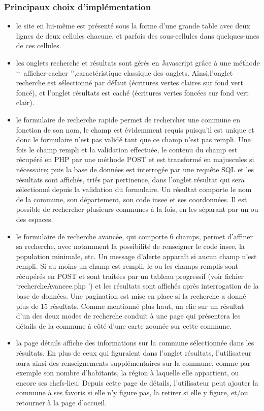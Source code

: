 \documentclass{report}
\begin{document}
\subsubsection*{Principaux choix d'implémentation}
\begin{itemize}
\item le site en lui-même est présenté sous la forme d'une grande table avec deux lignes de deux cellules chacune, et parfois des sous-cellules dans quelques-unes de ces cellules.
\item les onglets recherche et résultats sont gérés en Javascript grâce à une méthode \lq\lq\ afficher-cacher \rq\rq,caractéristique classique des onglets. Ainsi,l'onglet recherche est sélectionné par défaut (écritures vertes claires sur fond vert foncé), et l'onglet résultats est caché (écritures vertes foncées sur fond vert clair).
\item le formulaire de recherche rapide permet de rechercher une commune en fonction de son nom, le champ est évidemment requis puisqu'il est unique et donc le formulaire n'est pas validé tant que ce champ n'est pas rempli. Une fois le champ rempli et la validation effectuée, le contenu du champ est récupéré en PHP par une méthode POST et est transformé en majuscules si nécessaire; puis la base de données est interrogée par une requête SQL et les résultats sont affichés, triés par pertinence, dans l'onglet résultat qui sera sélectionné depuis la validation du formulaire. Un résultat comporte le nom de la commune, son département, son code insee et ses coordonnées. Il est possible de rechercher plusieurs communes à la fois, en les séparant par un ou des espaces.
\item le formulaire de recherche avancée, qui comporte 6 champs, permet d'affiner sa recherche, avec notamment la possibilité de renseigner le code insee, la population minimale, etc. Un message d'alerte apparaît si aucun champ n'est rempli. Si au moins un champ est rempli, le ou les champs remplis sont récupérés en POST et sont traitées par un tableau progressif (voir fichier \lq rechercheAvancee.php \rq) et les résultats sont affichés après interrogation de la base de données. Une pagination est mise en place si la recherche a donné plus de 15 résultats. Comme mentionné plus haut, un clic sur un résultat d'un des deux modes de recherche conduit à une page qui présentera les détails de la commune à côté d'une carte zoomée sur cette commune.
\item la page détails affiche des informations sur la commune sélectionnée dans les résultats. En plus de ceux qui figuraient dans l'onglet résultats, l'utilisateur aura ainsi des renseignements supplémentaires sur la commune, comme par exemple son nombre d'habitants, la région à laquelle elle appartient, ou encore ses chefs-lieu. Depuis cette page de détails, l'utilisateur peut ajouter la commune à ses favoris si elle n'y figure pas, la retirer si elle y figure, et/ou retourner à la page d'accueil.

\end{itemize}
\end{document}
